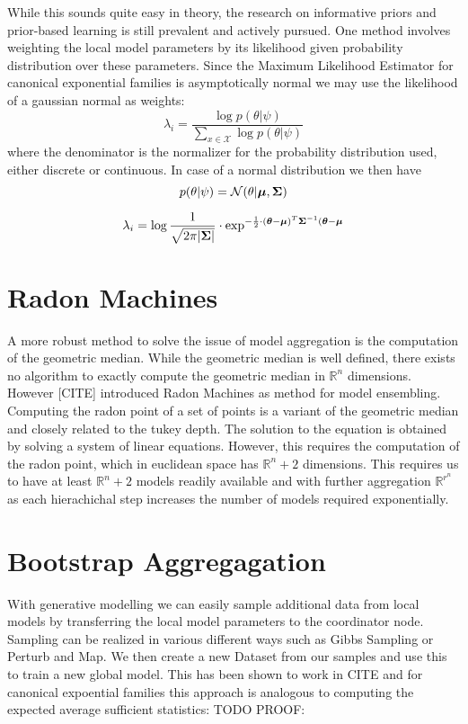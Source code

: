 While this sounds quite easy in theory, the research on informative priors and prior-based learning is still prevalent and actively pursued.
One method involves weighting the local model parameters by its likelihood given probability distribution over these parameters.
Since the Maximum Likelihood Estimator for canonical exponential families is asymptotically normal we may use the likelihood of a gaussian normal as weights:
\begin{equation}
    \lambda_i = \frac{\log p(\theta \lvert \psi)}{\sum_{x\in \mathcal{X}} \log p(\theta \lvert \psi)}
\end{equation}
where the denominator is the normalizer for the probability distribution used, either discrete or continuous.
In case of a normal distribution we then have
\begin{equation}
    p(\theta \lvert \psi) = \mathcal{N}(\theta \lvert \boldsymbol{\mu}, \boldsymbol{\Sigma})
\end{equation}

\begin{equation}
    \lambda_i = \log \frac{1}{\sqrt{2\pi\lvert \boldsymbol{\Sigma} \rvert}} \cdot \exp^{-\frac{1}{2} \cdot (\boldsymbol{\theta} - \boldsymbol{\mu})^T\boldsymbol{\Sigma}^{-1}(\boldsymbol{\theta} - \boldsymbol{\mu}}
\end{equation}
\section{Radon Machines}
A more robust method to solve the issue of model aggregation is the computation of the geometric median.
While the geometric median is well defined, there exists no algorithm to exactly compute the geometric median in $\mathbb{R}^n$ dimensions.
However [CITE] introduced Radon Machines as method for model ensembling.
Computing the radon point of a set of points is a variant of the geometric median and closely related to the tukey depth. 
The solution to the equation is obtained by solving a system of linear equations.
However, this requires the computation of the radon point, which in euclidean space has $\mathbb{R}^n + 2$ dimensions.
This requires us to have at least $\mathbb{R}^n + 2$ models readily available and with further aggregation $\mathbb{R}^{r^n}$ as each hierachichal step increases the number of models required exponentially.

\section{Bootstrap Aggregagation}
With generative modelling we can easily sample additional data from local models by transferring the local model parameters to the coordinator node.
Sampling can be realized in various different ways such as Gibbs Sampling or Perturb and Map.
We then create a new Dataset from our samples and use this to train a new global model. 
This has been shown to work in CITE and for canonical expoential families this approach is analogous to computing the expected average sufficient statistics:
TODO PROOF:


